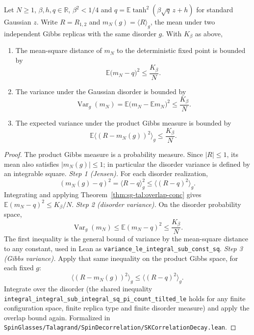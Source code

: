 \begin{theorem}\label{thm:sg-tal:gibbs-overlap-variance}
\leanok
{}
Let $N\ge1$, $\beta,h,q\in\mathbb R$, $\beta^2<1/4$ and
$q=\mathbb E\tanh^2(\beta\sqrt q\,z+h)$ for standard Gaussian $z$. Write $R=R_{1,2}$ and
$m_N(g)=\langle R\rangle_g$, the mean under two independent Gibbs replicas with the
same disorder $g$. With $K_\beta$ as above,
\begin{enumerate}
\item The mean-square distance of $m_N$ to the deterministic fixed point is bounded by
\[
\mathbb E\bigl(m_N-q\bigr)^2\le\frac{K_\beta}{N}.
\]
\item The variance under the Gaussian disorder is bounded by
\[
\operatorname{Var}_g(m_N)
=\mathbb E\bigl(m_N-\mathbb E m_N\bigr)^2\le\frac{K_\beta}{N}.
\]
\item The expected variance under the product Gibbs measure is bounded by
\[
\mathbb E\big\langle(R-m_N(g))^2\big\rangle_g\le\frac{K_\beta}{N}.
\]
\end{enumerate}
\end{theorem}
\begin{proof}
\leanok
The product Gibbs measure is a probability measure. Since $|R|\le1$, its mean also
satisfies $|m_N(g)|\le1$; in particular the disorder variance is defined by an
integrable square.
\emph{Step 1 (Jensen).} For each disorder realization,
\[
(m_N(g)-q)^2=\langle R-q\rangle_g^2\le\langle(R-q)^2\rangle_g.
\]
Integrating and applying Theorem~\ref{thm:sg-tal:overlap-conc} gives
$\mathbb E(m_N-q)^2\le K_\beta/N$.
\emph{Step 2 (disorder variance).} On the disorder probability space,
\[
\operatorname{Var}_g(m_N)\le\mathbb E(m_N-q)^2\le\frac{K_\beta}{N}.
\]
The first inequality is the general bound of variance by the mean-square distance
to any constant, used in Lean as \texttt{variance\_le\_integral\_sub\_const\_sq}.
\emph{Step 3 (Gibbs variance).} Apply that same inequality on the product Gibbs space,
for each fixed $g$:
\[
\big\langle(R-m_N(g))^2\big\rangle_g\le\langle(R-q)^2\rangle_g.
\]
Integrate over the disorder (the shared inequality
\texttt{integral\_integral\_sub\_integral\_sq\_pi\_count\_tilted\_le} holds for any finite configuration
space, finite replica type and finite disorder measure) and apply the overlap bound again.
Formalized in \texttt{SpinGlasses/Talagrand/SpinDecorrelation/SKCorrelationDecay.lean}.
\end{proof}

